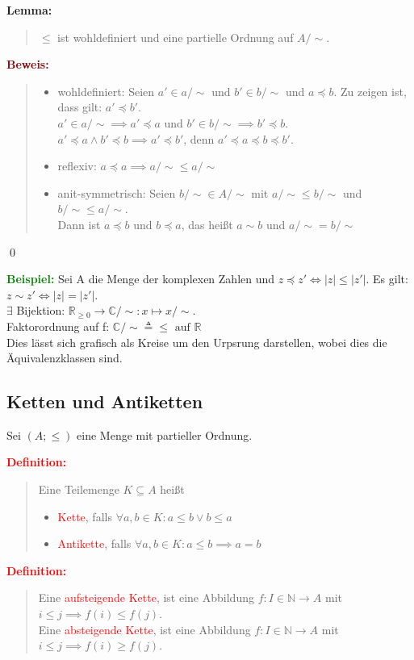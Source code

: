 \documentclass{article}
\newcommand{\red}[1]{\textcolor{red}{#1}}
\newcommand{\green}[1]{\textcolor{green}{#1}}
\newcommand{\dgr}[1]{\textcolor{dgr}{#1}}
\newcommand{\maroon}[1]{\textcolor{maroon}{#1}}
\newcommand{\ex}{\green{\textbf{Beispiel: }}}
\newcommand{\de}[1]{\red{\textbf{Definition: }}\begin{quote}#1\end{quote}}
\newcommand{\lem}[1]{\dgr{\textbf{Lemma: }}\begin{quote}#1\end{quote}}
\newcommand{\pr}[1]{\maroon{\textbf{Beweis: }}\begin{quote}#1\end{quote}\qed}
\newcommand{\N}{\mathbb{N}}
\newcommand{\R}{\mathbb{R}}
\newcommand{\C}{\mathbb{C}}
\begin{document}
\lem{
    $\le$ ist wohldefiniert und eine partielle Ordnung auf $A / \sim$.
}
\pr{
    \begin{itemize}
        \item wohldefiniert: Seien $a' \in a / \sim$ und $b' \in b / \sim$ und $a \preceq b$. Zu zeigen ist, dass gilt: $a' \preceq b'$.\\
        $a' \in a / \sim \implies a' \preceq a$ und $b' \in b / \sim \implies b' \preceq b$.\\
        $a' \preceq a \land b' \preceq b \implies a' \preceq b'$, denn $a' \preceq a \preceq b \preceq b'$.
        \item reflexiv: $a \preceq a \implies a / \sim \le a / \sim$
        \item anit-symmetrisch: Seien $b / \sim \in A / \sim$ mit $a / \sim \le b / \sim$ und $b / \sim \le a / \sim$.\\
        Dann ist $a \preceq b$ und $b \preceq a$, das heißt $a \sim b$ und $a / \sim = b / \sim$
    \end{itemize}
}

\ex Sei A die Menge der komplexen Zahlen und $z \preceq z' \iff |z| \le |z'|$. Es gilt: $z \sim z' \iff |z| = |z'|$.\\
$\exists$ Bijektion: $\R_{\ge 0} \to \C / \sim: x \mapsto x / \sim$.\\
Faktorordnung auf f: $\C / \sim \triangleq \le \text{ auf } \R$\\
Dies lässt sich grafisch als Kreise um den Urpsrung darstellen, wobei dies die Äquivalenzklassen sind.

\subsection{Ketten und Antiketten}

Sei $(A; \le)$ eine Menge mit partieller Ordnung.

\de{
    Eine Teilemenge $K \subseteq A$ heißt
    \begin{itemize}
        \item \red{Kette}, falls $\forall a,b \in K: a \le b \lor b \le a$
        \item \red{Antikette}, falls $\forall a,b \in K: a \le b \implies a = b$
    \end{itemize}
}

\de{
    Eine \red{aufsteigende Kette}, ist eine Abbildung $f: I \in \N \to A$ mit $i \le j \implies f(i) \le f(j)$.\\
    Eine \red{absteigende Kette}, ist eine Abbildung $f: I \in \N \to A$ mit $i \le j \implies f(i) \ge f(j)$.
}
\end{document}
